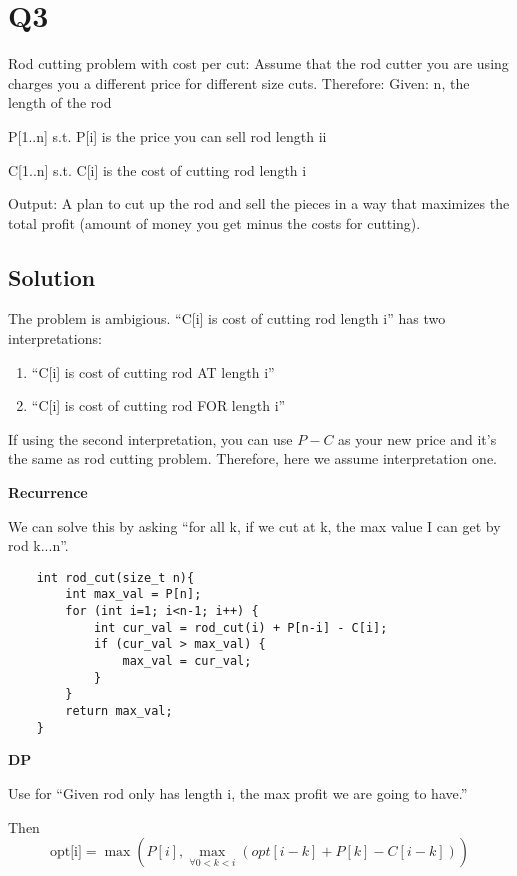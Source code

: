 
\section*{Q3}

Rod cutting problem with cost per cut:
Assume that the rod cutter you are using charges you a different price for different size cuts.
Therefore:
Given:
n, the length of the rod

P[1..n] s.t. P[i] is the price you can sell rod length ii

C[1..n] s.t. C[i] is the cost of cutting rod length i

Output:  A plan to cut up the rod and sell the pieces in
a way that maximizes the total profit (amount of money you get minus the costs for cutting).

\subsection*{Solution}

The problem is ambigious. ``C[i] is cost of cutting rod length i'' has two interpretations:

\begin{enumerate}
    \item ``C[i] is cost of cutting rod AT length i''
    \item ``C[i] is cost of cutting rod FOR length i''
\end{enumerate}

If using the second interpretation, you can use $P-C$ as your new price and it's the same as rod cutting problem.
Therefore, here we assume interpretation one.

\textbf{Recurrence}

We can solve this by asking ``for all k, if we cut at k, the max value I can get by rod k...n''.

\begin{lstlisting}
    int rod_cut(size_t n){
        int max_val = P[n];
        for (int i=1; i<n-1; i++) {
            int cur_val = rod_cut(i) + P[n-i] - C[i];
            if (cur_val > max_val) {
                max_val = cur_val;
            }
        }
        return max_val;
    }
\end{lstlisting}

\textbf{DP}

Use  for ``Given rod only has length i, the max profit we are going to have.''

Then $$\text{opt[i]} = \max(P[i], \max_{\forall 0 < k < i}(opt[i-k] + P[k] - C[i-k]))$$